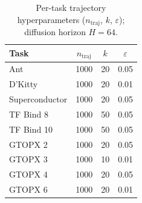 \begin{table}[t]
\centering
\caption{Per-task trajectory hyperparameters ($n_{\mathrm{traj}}$, $k$, $\varepsilon$); diffusion horizon $H=64$.}
\label{tab:duo-traj-hyperparams}
\begin{tabular}{lccc}
\toprule
Task & $n_{\mathrm{traj}}$ & $k$ & $\varepsilon$ \\
\midrule
Ant & 1000 & 20 & 0.05 \\
D'Kitty & 1000 & 20 & 0.01 \\
Superconductor & 1000 & 20 & 0.05 \\
TF Bind 8 & 1000 & 50 & 0.05 \\
TF Bind 10 & 1000 & 50 & 0.05 \\
GTOPX 2 & 1000 & 20 & 0.05 \\
GTOPX 3 & 1000 & 10 & 0.01 \\
GTOPX 4 & 1000 & 20 & 0.05 \\
GTOPX 6 & 1000 & 20 & 0.01 \\
\bottomrule
\end{tabular}
\end{table}
